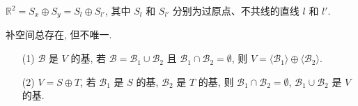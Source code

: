 \documentclass{note}
\begin{document}
\begin{eg}
    $\mathbb{R}^2=S_x\oplus S_y=S_l\oplus S_{l'}$, 其中 $S_l$ 和 $S_{l'}$ 分别为过原点、不共线的直线 $l$ 和 $l'$.
\end{eg}

补空间总存在, 但不唯一.

\begin{thm}[(课本定理 1.13)]
    \begin{itemize}
        \item[(1)] $\mathcal{B}$ 是 $V$ 的基, 若 $\mathcal{B}=\mathcal{B}_1\cup\mathcal{B}_2$ 且 $\mathcal{B}_1\cap\mathcal{B}_2=\emptyset$, 则 $V=\langle\mathcal{B}_1\rangle\oplus\langle\mathcal{B}_2\rangle$.
        \item[(2)] $V=S\oplus T$, 若 $\mathcal{B}_1$ 是 $S$ 的基, $\mathcal{B}_2$ 是 $T$ 的基, 则 $\mathcal{B}_1\cap\mathcal{B}_2=\emptyset$, $\mathcal{B}_1\cup\mathcal{B}_2$ 是 $V$ 的基.
    \end{itemize}
\end{thm}
\end{document}
